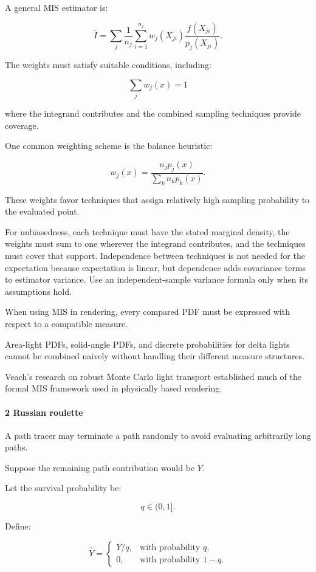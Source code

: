 A general MIS estimator is:

\[
 \boxed{ \widehat I= \sum_j\frac1{n_j} \sum_{i=1}^{n_j} w_j(X_{ji}) \frac{f(X_{ji})}{p_j(X_{ji})} }.
\]

The weights must satisfy suitable conditions, including:

\[
 \sum_jw_j(x)=1
\]

where the integrand contributes and the combined sampling techniques provide coverage.

One common weighting scheme is the balance heuristic:

\[
 \boxed{ w_j(x)= \frac{n_jp_j(x)} {\sum_kn_kp_k(x)} }.
\]

These weights favor techniques that assign relatively high sampling probability to the evaluated point.

For unbiasedness, each technique must have the stated marginal density, the weights must sum to one wherever the integrand contributes, and the techniques must cover that support. Independence between techniques is not needed for the expectation because expectation is linear, but dependence adds covariance terms to estimator variance. Use an independent-sample variance formula only when its assumptions hold.

When using MIS in rendering, every compared PDF must be expressed with respect to a compatible measure.

Area-light PDFs, solid-angle PDFs, and discrete probabilities for delta lights cannot be combined naively without handling their different measure structures.

Veach's research on robust Monte Carlo light transport established much of the formal MIS framework used in physically based rendering.

\paragraph{2 Russian roulette}\label{russian-roulette}

A path tracer may terminate a path randomly to avoid evaluating arbitrarily long paths.

Suppose the remaining path contribution would be \(Y\).

Let the survival probability be:

\[
 q\in(0,1].
\]

Define:

\[
 \widehat Y= \begin{cases} Y/q,&\text{with probability }q,\\ 0,&\text{with probability }1-q. \end{cases}
\]

